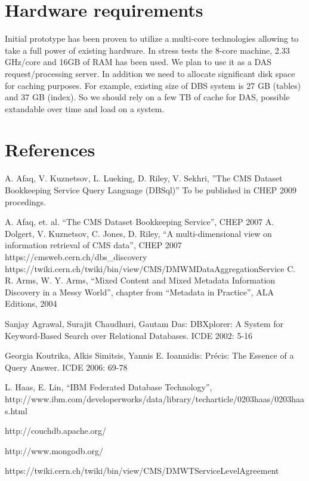 \documentclass[a4paper]{jpconf}
\begin{document}
\section{Hardware requirements}
Initial prototype has been proven to utilize a multi-core technologies
allowing to take a full power of existing hardware. In stress tests
the 8-core machine, 2.33 GHz/core and 16GB of RAM has been
used. We plan to use it as a DAS request/processing server. In addition
we need to allocate significant disk space for caching purposes.
For example, existing size of DBS system is 27 GB (tables) and 37 GB (index).
So we should rely on a few TB of cache for DAS, possible extandable over
time and load on a system.

\section*{References}
\begin{thebibliography}{9}
  A. Afaq, V. Kuznetsov, L. Lueking, D. Riley, V. Sekhri,
''The CMS Dataset Bookkeeping Service Query Language (DBSql)''
To be published in CHEP 2009 procedings.

 A. Afaq, et. al. ``The CMS Dataset Bookkeeping Service'', CHEP 2007 
 A. Dolgert, V. Kuznetsov, C. Jones, D. Riley, 
``A multi-dimensional view on information retrieval of CMS data'', CHEP 2007
 https://cmsweb.cern.ch/dbs\_discovery
 https://twiki.cern.ch/twiki/bin/view/CMS/DMWMDataAggregationService
C. R. Arms, W. Y. Arms, ``Mixed Content and Mixed Metadata 
Information Discovery in a Messy World'',
chapter from ``Metadata in Practice'', ALA Editions, 2004

Sanjay Agrawal, Surajit Chaudhuri, Gautam Das: DBXplorer: A System for
Keyword-Based Search over Relational Databases. ICDE 2002: 5-16

Georgia Koutrika, Alkis Simitsis, Yannis E. Ioannidis: Pr\'{e}cis: The Essence of
a Query Answer. ICDE 2006: 69-78

L. Haas, E. Lin,
``IBM Federated Database Technology'', \\
http://www.ibm.com/developerworks/data/library/techarticle/0203haas/0203haas.html

http://couchdb.apache.org/

http://www.mongodb.org/

https://twiki.cern.ch/twiki/bin/view/CMS/DMWTServiceLevelAgreement

\end{thebibliography}
\end{document}

